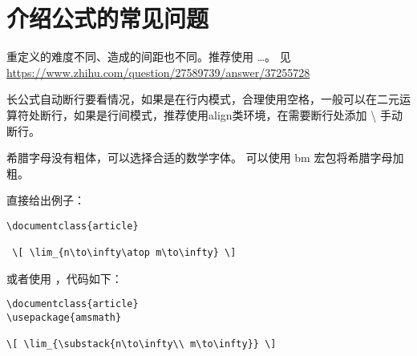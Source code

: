 %
%
%
%

\section{介绍公式的常见问题}



重定义的难度不同、造成的间距也不同。推荐使用 \cs{[} \ldots \cs{]}。 见
\url{https://www.zhihu.com/question/27589739/answer/37255728}



长公式自动断行要看情况，如果是在行内模式，合理使用空格，一般可以在二元运算符处断行，如果是行间模式，推荐使用align类环境，在需要断行处添加
\textbackslash{} 手动断行。



希腊字母没有粗体，可以选择合适的数学字体。 可以使用 bm
宏包将希腊字母加粗。



直接给出例子：

\begin{verbatim}
\documentclass{article}

 \[ \lim_{n\to\infty\atop m\to\infty} \]

\end{verbatim}

或者使用 ，代码如下：

\begin{verbatim}
\documentclass{article}
\usepackage{amsmath}

\[ \lim_{\substack{n\to\infty\\ m\to\infty}} \]

\end{verbatim}

